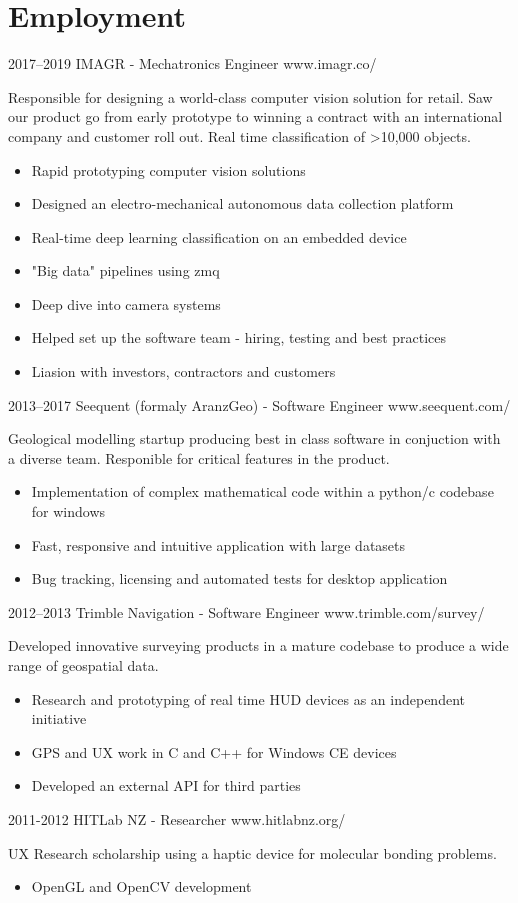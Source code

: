 \documentclass[print]{friggeri-cv} %
\begin{document}
\section{Employment}
\begin{entrylist}
\entry
{2017--2019}
{IMAGR - Mechatronics Engineer}
{www.imagr.co/}
{Responsible for designing a world-class computer vision solution for retail. Saw our product go from early prototype to winning a contract with an international company and customer roll out. Real time classification of >10,000 objects.
\begin{itemize}
\item Rapid prototyping computer vision solutions
\item Designed an electro-mechanical autonomous data collection platform
\item Real-time deep learning classification on an embedded device
\item "Big data" pipelines using zmq
\item Deep dive into camera systems
\item Helped set up the software team - hiring, testing and best practices
\item Liasion with investors, contractors and customers
\end{itemize}}

\entry
{2013--2017}
{Seequent (formaly AranzGeo) - Software Engineer}
{www.seequent.com/}
{Geological modelling startup producing best in class software in conjuction with a diverse team. Responible for critical features in the product.
\begin{itemize}
\item Implementation of complex mathematical code within a python/c codebase for windows
\item Fast, responsive and intuitive application with large datasets
\item Bug tracking, licensing and automated tests for desktop application
\end{itemize}}

\entry
{2012--2013}
{Trimble Navigation - Software Engineer}
{www.trimble.com/survey/}
{Developed innovative surveying products in a mature codebase to produce a wide range of geospatial data.
\begin{itemize}
\item Research and prototyping of real time HUD devices as an independent initiative
\item GPS and UX work in C and C++ for Windows CE devices
\item Developed an external API for third parties
\end{itemize}}

\entry
{2011-2012}
{HITLab NZ - Researcher}
{www.hitlabnz.org/}
{UX Research scholarship using a haptic device for molecular bonding problems.
\begin{itemize}
\item OpenGL and OpenCV development
\end{itemize}}
\end{entrylist}\\ 
\end{document}
